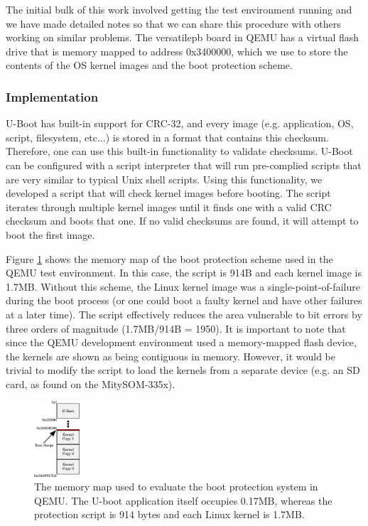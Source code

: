 The initial bulk of this work involved getting the test environment running and
we have made detailed notes so that we can share this procedure with others
working on similar problems.  The versatilepb board in QEMU has a virtual flash
drive that is memory mapped to address 0x3400000, which we use to store the
contents of the OS kernel images and the boot protection scheme.

\subsubsection{Implementation}
U-Boot has built-in support for CRC-32, and every image (e.g. application, OS,
script, filesystem, etc...) is stored in a format that contains this checksum.
Therefore, one can use this built-in functionality to validate checksums.
U-Boot can be configured with a script interpreter that will run pre-complied
scripts that are very similar to typical Unix shell scripts. Using this
functionality, we developed a script that will check kernel images before
booting. The script iterates through multiple kernel images until it finds one
with a valid CRC checksum and boots that one.  If no valid checksums are found,
it will attempt to boot the first image.  

Figure \ref{fig:mem_map} shows the memory map of the boot protection scheme
used in the QEMU test environment.  In this case, the script is 914B and each
kernel image is 1.7MB.  Without this scheme, the Linux kernel image was a
single-point-of-failure during the boot process (or one could boot a faulty
kernel and have other failures at a later time).  The script effectively reduces
the area vulnerable to bit errors by three orders of magnitude (1.7MB/914B =
1950).  It is important to note that since the QEMU development environment used
a memory-mapped flash device, the kernels are shown as being contiguous in
memory.  However, it would be trivial to modify the script to load the kernels
from a separate device (e.g. an SD card, as found on the MitySOM-335x).


\begin{figure}
  \centering
  \includegraphics[width=0.15\textwidth]{images/mem_map}
  \caption{The memory map used to evaluate the boot protection system in QEMU.
           The U-boot application itself occupies 0.17MB, whereas the protection
           script is 914 bytes and each Linux kernel is
           1.7MB.}\label{fig:mem_map}
\end{figure}

